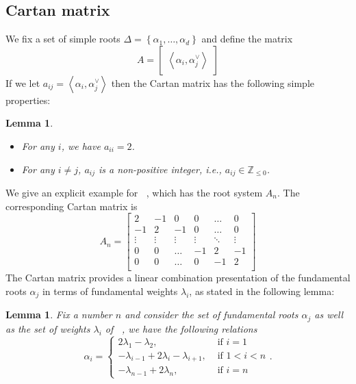 \documentclass[12pt]{article} %
\newtheorem{lemma}[definition]{Lemma}
\DeclareMathOperator{\SLn}{\text{SL}_n(\mathbb{R})}
\DeclareMathOperator{\slnr}{\mathfrak{sl}_n(\mathbb{R})}
\begin{document}
\subsection{Cartan matrix}
We fix a set of simple roots $\Delta = \left\lbrace \alpha_1,\ldots,\alpha_d \right\rbrace$ and define the matrix
\[A = \begin{bmatrix} \left\langle \alpha_i,\alpha_j^\vee  \right\rangle
    \end{bmatrix}\]
If we let $a_{ij}=  \left\langle \alpha_i,\alpha_j^\vee\right\rangle$ then the Cartan matrix has the following simple properties:
\begin{lemma}
    \hfill
    \begin{itemize}
        \item For any $i$, we have $a_{ii}=2$.
        \item For any $i \ne j$, $a_{ij}$ is a non-positive integer, i.e., $a_{ij} \in \mathbb{Z}_{\le 0}$.
    \end{itemize}
\end{lemma}
We give an explicit example for $\slnr$, which has the root system $A_n$. The corresponding Cartan matrix is
\[A_n = \begin{bmatrix}
        2      & -1     & 0      & 0      & \ldots & 0      \\
        -1     & 2      & -1     & 0      & \ldots & 0      \\
        \vdots & \vdots & \vdots & \vdots & \ddots & \vdots \\
        0      & 0      & \ldots & -1     & 2      & -1     \\
        0      & 0      & \ldots & 0      & -1     & 2      \\
    \end{bmatrix}\]
The Cartan matrix provides a linear combination presentation of the fundamental roots $\alpha_j$ in terms of fundamental weights $\lambda_i$,
as stated in the following lemma:
\begin{lemma}\label{weight-root-comb}
    Fix a number $n$ and consider the set of fundamental roots $\alpha_j$ as well as the set of weights $\lambda_i$ of $\SLn$, we have the following relations
    \[\alpha_i = \begin{cases}
            2\lambda_1-\lambda_2,                    & \mbox{ if } i = 1 \\
            -\lambda_{i-1}+2\lambda_i-\lambda_{i+1}, & \mbox{ if } 1<i<n \\
            -\lambda_{n-1}+2\lambda_n,               & \mbox{ if } i =n
        \end{cases}.\]
\end{lemma}
\end{document}
